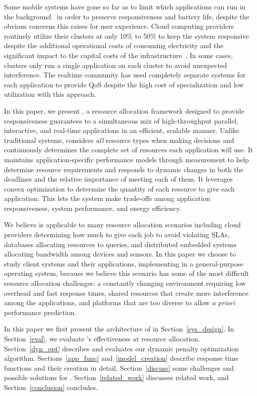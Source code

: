 Some mobile systems have gone so far as to limit which applications can run in the background~\cite{iOsDev} in order to preserve responsiveness and battery life, despite the obvious concerns this raises for user experience.  Cloud computing providers routinely utilize their clusters at only 10\% to 50\% to keep the system responsive despite the additional operational costs of consuming electricity and the significant impact to the capital costs of the infrastructure~\cite{Barroso2009,Hennessy2011}. In some cases, clusters only run a single application on each cluster to avoid unexpected interference. The realtime community has used completely separate systems for each application to provide QoS despite the high cost of specialization and low utilization with this approach.

In this paper, we present \pacora, a resource allocation framework designed to provide responsiveness guarantees to a simultaneous mix of high-throughput parallel, interactive, and real-time applications in an efficient, scalable manner.  Unlike traditional systems, \pacora considers \emph{all} resource types when making decisions and continuously determines the complete set of resources each application will use.   It maintains application-specific performance models through measurement to help determine resource requirements and responds to dynamic changes in both the deadlines and the relative importance of meeting each of them. It leverages convex optimization to determine the quantity of each resource to give each application. This lets the system make trade-offs among application responsiveness, system performance, and energy efficiency.

We believe \pacora is applicable to many resource allocation scenarios including cloud providers determining how much to give each job to avoid violating SLAs, databases allocating resources to queries, and distributed embedded systems allocating bandwidth among devices and sensors.  In this paper we choose to study client systems and their applications, implementing \pacora in a general-purpose operating system, because we believe this scenario has some of the most difficult resource allocation challenges: a constantly changing environment requiring low overhead and fast response times, shared resources that create more interference among the applications, and platforms that are too diverse to allow \emph{a priori} performance prediction.


In this paper we first present the architecture of \pacora in Section~\ref{sys_design}.  In Section~\ref{eval}, we evaluate \pacora's effectiveness at resource allocation. Section~\ref{dyn_opt} describes and evaluates our dynamic penalty optimization algorithm. Sections~\ref{app_func} and~\ref{model_creation} describe response time functions and their creation in detail.  Section~\ref{discuss} some challenges and possible solutions for \pacora. Section~\ref{related_work} discusses related work, and Section~\ref{conclusion} concludes.
